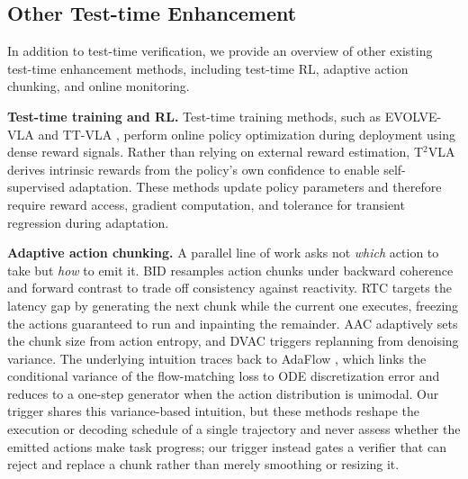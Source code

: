 \documentclass[10pt,twocolumn,letterpaper]{article}
\begin{document}
\subsection{Other Test-time Enhancement}
In addition to test-time verification, we provide an overview of other existing test-time enhancement methods, including test-time RL, adaptive action chunking, and online monitoring.

\textbf{Test-time training and RL.} Test-time training methods, such as EVOLVE-VLA \citep{bai2025evolvevlatesttimetrainingenvironment} and TT-VLA \citep{liu2026ontheflyvlaadaptationtesttime}, perform online policy optimization during deployment using dense reward signals. Rather than relying on external reward estimation, T$^2$VLA \citep{chen2026trustinstinctsconfidencedriventesttime} derives intrinsic rewards from the policy's own confidence to enable self-supervised adaptation. These methods update policy parameters and therefore require reward access, gradient computation, and tolerance for transient regression during adaptation.

\textbf{Adaptive action chunking.} A parallel line of work asks not \emph{which} action to take but \emph{how} to emit it. BID \citep{liu2025bidirectional} resamples action chunks under backward coherence and forward contrast to trade off consistency against reactivity. RTC \citep{black2025realtime} targets the latency gap by generating the next chunk while the current one executes, freezing the actions guaranteed to run and inpainting the remainder. AAC \citep{liang2026adaptiveactionchunkinginferencetime} adaptively sets the chunk size from action entropy, and DVAC \citep{feng2026denoising} triggers replanning from denoising variance. The underlying intuition traces back to AdaFlow \citep{hu2024adaflowimitationlearningvarianceadaptive}, which links the conditional variance of the flow-matching loss to ODE discretization error and reduces to a one-step generator when the action distribution is unimodal. Our trigger shares this variance-based intuition, but these methods reshape the execution or decoding schedule of a single trajectory and never assess whether the emitted actions make task progress; our trigger instead gates a verifier that can reject and replace a chunk rather than merely smoothing or resizing it.
\end{document}
